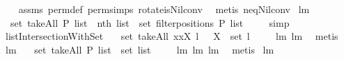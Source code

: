 \begin{isabellebody}
%
\isadelimproof
\ \ %
\endisadelimproof
%
\isatagproof
{}\isamarkupfalse%
\ assms\ perm{}{\isacharunderscore}def\ perm{}{\isachardot}simps{\isacharparenleft}{}{\isacharparenright}\ rotate{\isacharunderscore}is{\isacharunderscore}Nil{\isacharunderscore}conv\ \isamarkupfalse%
\ {\isacharparenleft}metis\ neq{\isacharunderscore}Nil{\isacharunderscore}conv{\isacharparenright}%
\endisatagproof
{\isafoldproof}%
%
\isadelimproof
\isanewline
%
\endisadelimproof
\isanewline
{}\isamarkupfalse%
\ lm{}{}{}{\isacharcolon}\ \isanewline
\ \ {\isachardoublequoteopen}set\ {\isacharparenleft}takeAll\ P\ list{\isacharparenright}\ {\isacharequal}\ {\isacharparenleft}{\isacharparenleft}nth\ list{\isacharparenright}\ {\isacharbackquote}\ set\ {\isacharparenleft}filterpositions{}\ P\ list{\isacharparenright}{\isacharparenright}{\isachardoublequoteclose}\ \isanewline
%
\isadelimproof
\ \ %
\endisadelimproof
%
\isatagproof
{}\isamarkupfalse%
\ simp%
\endisatagproof
{\isafoldproof}%
%
\isadelimproof
\isanewline
%
\endisadelimproof
\isanewline
{}\isamarkupfalse%
\ listIntersectionWithSet{\isacharcolon}\ \isanewline
\ \ {\isachardoublequoteopen}set\ {\isacharparenleft}takeAll\ {\isacharparenleft}{\isacharpercent}x{\isachardot}{\isacharparenleft}x{\isasymin}X{\isacharparenright}{\isacharparenright}\ l{\isacharparenright}\ {\isasymsubseteq}\ \ {\isacharparenleft}X\ {\isasyminter}\ set\ l{\isacharparenright}{\isachardoublequoteclose}\ \isanewline
%
\isadelimproof
\ \ %
\endisadelimproof
%
\isatagproof
{}\isamarkupfalse%
\ lm{}{}{}\ lm{}{}{}\ \isamarkupfalse%
\ metis%
\endisatagproof
{\isafoldproof}%
%
\isadelimproof
\isanewline
%
\endisadelimproof
\isanewline
{}\isamarkupfalse%
\ lm{}{}{}{\isacharcolon}\ \isanewline
\ \ {\isachardoublequoteopen}set\ {\isacharparenleft}takeAll\ P\ list{\isacharparenright}\ {\isasymsubseteq}\ set\ list{\isachardoublequoteclose}\ \isanewline
%
\isadelimproof
\ \ %
\endisadelimproof
%
\isatagproof
{}\isamarkupfalse%
\ lm{}{}{}\ lm{}{}{}\ lm{}{}{}\ \isamarkupfalse%
\ metis%
\endisatagproof
{\isafoldproof}%
%
\isadelimproof
\isanewline
%
\endisadelimproof
\isanewline
{}\isamarkupfalse%
\ lm{}{}{}{\isacharcolon}\ \isanewline

\end{isabellebody}

